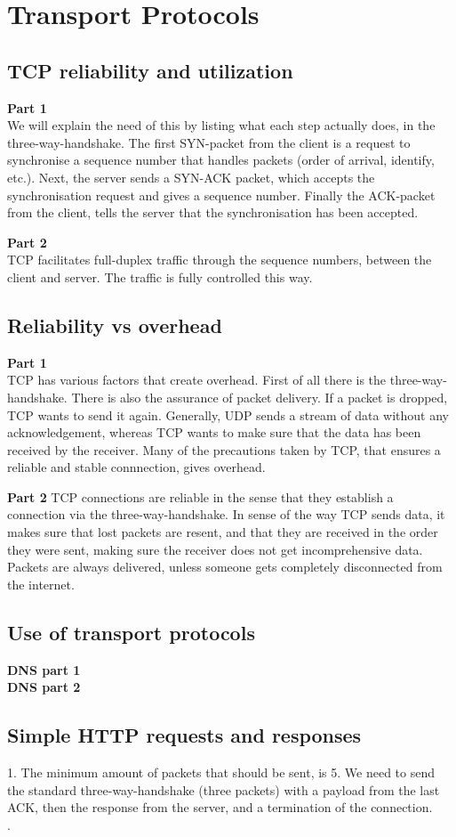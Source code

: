 \section{Transport Protocols}
\subsection{TCP reliability and utilization}
\textbf{Part 1} \\
We will explain the need of this by listing what each step actually does, in the
three-way-handshake. The first SYN-packet from the client is a request to
synchronise a sequence number that handles packets (order of arrival, identify,
etc.). Next, the server sends a SYN-ACK packet, which accepts the synchronisation
request and gives a sequence number. Finally the ACK-packet from the client,
tells the server that the synchronisation has been accepted.

\noindent \textbf{Part 2} \\
TCP facilitates full-duplex traffic through the sequence numbers, between the
client and server. The traffic is fully controlled this way.

\subsection{Reliability vs overhead}
\textbf{Part 1} \\
TCP has various factors that create overhead. First of all there is the
three-way-handshake. There is also the assurance of packet delivery. If a
packet is dropped, TCP wants to send it again. Generally, UDP sends a stream of
data without any acknowledgement, whereas TCP wants to make sure that the data
has been received by the receiver. Many of the precautions taken by TCP, that
ensures a reliable and stable connnection, gives overhead.

\noindent \textbf{Part 2}
TCP connections are reliable in the sense that they establish a connection via
the three-way-handshake. In sense of the way TCP sends data, it makes sure that
lost packets are resent, and that they are received in the order they were sent,
making sure the receiver does not get incomprehensive data. Packets are always
delivered, unless someone gets completely disconnected from the internet.

\subsection{Use of transport protocols}
\textbf{DNS part 1} \\

\noindent \textbf{DNS part 2} \\

\subsection*{Simple HTTP requests and responses}
1. The minimum amount of packets that should be sent, is 5. We need to send the
standard three-way-handshake (three packets) with a payload from the last ACK,
then the response from the server, and a termination of the connection. \\

. 
